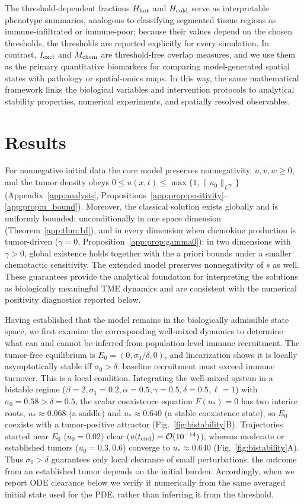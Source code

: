 \documentclass[]{interact}
\theoremstyle{plain}%
\theoremstyle{definition}
\theoremstyle{remark}
\begin{document}
The threshold-dependent fractions $H_{\rm hot}$ and $H_{\rm cold}$ serve as
interpretable phenotype summaries, analogous to classifying segmented tissue
regions as immune-infiltrated or immune-poor; because their values depend on the
chosen thresholds, the thresholds are reported explicitly for every simulation.
In contrast, $I_{\rm excl}$ and $M_{\rm chem}$ are threshold-free overlap
measures, and we use them as the primary quantitative biomarkers for comparing
model-generated spatial states with pathology or spatial-omics maps. In this
way, the same mathematical framework links the biological variables and
intervention protocols to analytical stability properties, numerical
experiments, and spatially resolved observables.

\section{Results}\label{sec:results}

For nonnegative initial data the core model preserves nonnegativity,
$u,v,w\ge0$, and the tumor density obeys
$0\le u(x,t)\le\max\{1,\|u_0\|_{L^\infty}\}$
(Appendix~\ref{app:analysis}, Propositions~\ref{app:prop:positivity}--%
\ref{app:prop:u_bound}). Moreover, the classical solution exists globally and is
uniformly bounded: unconditionally in one space dimension
(Theorem~\ref{app:thm:1d}), and in every dimension when chemokine production is
tumor-driven ($\gamma=0$, Proposition~\ref{app:prop:gamma0}); in two dimensions
with $\gamma>0$, global existence holds together with the a priori bounds under a smaller chemotactic sensitivity. The
extended model preserves nonnegativity of $s$ as well. These guarantees provide
the analytical foundation for interpreting the solutions as biologically
meaningful TME dynamics and are consistent with the numerical positivity
diagnostics reported below.

Having established that the model remains in the biologically admissible
state space, we first examine the corresponding well-mixed dynamics to
determine what can and cannot be inferred from population-level immune
recruitment. The tumor-free equilibrium is $E_0=(0,\sigma_0/\delta,0)$, and
linearization shows it is locally asymptotically stable iff
$\sigma_0>\delta$: baseline recruitment must exceed immune turnover. This is a
local condition. Integrating the well-mixed system in a bistable regime
($\beta=2,\sigma_1=0.2,\alpha=0.5,\gamma=0.5,\delta=0.5,\ell=1$) with
$\sigma_0=0.58>\delta=0.5$, the scalar coexistence equation $F(u_*)=0$ has two
interior roots, $u_*\approx0.068$ (a saddle) and $u_*\approx0.640$ (a stable
coexistence state), so $E_0$ coexists with a tumor-positive attractor
(Fig.~\ref{fig:bistability}B). Trajectories started near $E_0$ ($u_0=0.02$)
clear ($u(t_{\rm end})=\mathcal O(10^{-14})$), whereas moderate or established
tumors ($u_0=0.3,0.6$) converge to $u_*\approx0.640$
(Fig.~\ref{fig:bistability}A). Thus $\sigma_0>\delta$ guarantees only local
clearance of small perturbations; the outcome from an established tumor
depends on the initial burden. Accordingly, when we report ODE clearance below
we verify it numerically from the same averaged initial state used for the PDE,
rather than inferring it from the threshold.
\end{document}
